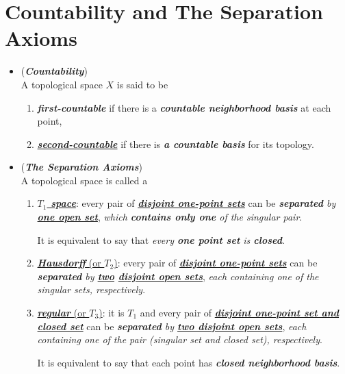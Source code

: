 \documentclass[11pt]{article}
\begin{document}
\section{Countability and The Separation Axioms}
\begin{itemize}
\item \begin{remark} (\emph{\textbf{Countability}})\\
A topological space $X$ is said to be 
\begin{enumerate}
\item \emph{\textbf{first-countable}} if there is a \emph{\textbf{countable neighborhood basis}} at each point, 
\item \underline{\emph{\textbf{second-countable}}} if there is \emph{\textbf{a countable basis}} for its topology.
\end{enumerate}
\end{remark}

\item \begin{remark} (\textbf{\emph{The Separation Axioms}})\\
A topological space is called a 
\begin{enumerate}
\item  \underline{\emph{\textbf{$T_1$ space}}}:  every pair of \underline{\emph{\textbf{disjoint one-point sets}}} can be \emph{\textbf{separated} by  \underline{\textbf{one open set}}}, \emph{which \textbf{contains only one} of the singular pair}. 

It is equivalent to say that \emph{every \textbf{one point set} is \textbf{closed}}.

\item \underline{\emph{\textbf{Hausdorff}} (or $T_2$)}:  every pair of \underline{\emph{\textbf{disjoint one-point sets}}} can be  \emph{\textbf{separated} by \textbf{\underline{two} \underline{disjoint open sets}}}, \emph{each containing one of the singular sets, respectively}.

\item \underline{\emph{\textbf{regular}} (or $T_3$)}:  it is $T_1$ and every pair of \underline{\emph{\textbf{disjoint one-point set and closed set}}} can be  \emph{\textbf{separated} by \textbf{\underline{two disjoint open sets}}}, \emph{each containing one of the pair (singular set and closed set), respectively}. 

It is equivalent to say that each point has \emph{\textbf{closed neighborhood basis}}.


\end{enumerate}
\end{remark}
\end{itemize}
\end{document}
